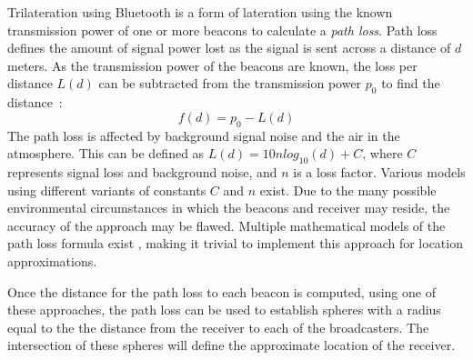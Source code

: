 Trilateration using Bluetooth is a form of lateration using the known transmission power of one or more beacons to calculate a \textit{path loss}.
Path loss defines the amount of signal power lost as the signal is sent across a distance of $d$ meters.
As the transmission power of the beacons are known, the loss per distance $L(d)$ can be subtracted from the transmission power $p_0$ to find the distance~\cite{taking_localization_to_the_wild}:
\begin{equation}\label{distance_equation}
    f(d) = p_0 - L(d)
\end{equation}
The path loss is affected by background signal noise and the air in the atmosphere.
This can be defined as $L(d) = 10n log_{10}(d)+C$, where $C$ represents signal loss and background noise, and $n$ is a loss factor. \cite{taking_localization_to_the_wild}
Various models using different variants of constants $C$ and $n$ exist\cite{path_loss_models}.
Due to the many possible environmental circumstances in which the beacons and receiver may reside, the accuracy of the approach may be flawed\cite{presence_ble_review}. 
Multiple mathematical models of the path loss formula exist \cite{rssi_indoor_pos,positioning_alg_rssi, RSSI_ZigBee_distance}, making it trivial to implement this approach for location approximations.

Once the distance for the path loss to each beacon is computed, using one of these approaches, the path loss can be used to establish spheres with a radius equal to the the distance from the receiver to each of the broadcasters. 
The intersection of these spheres will define the approximate location of the receiver. 